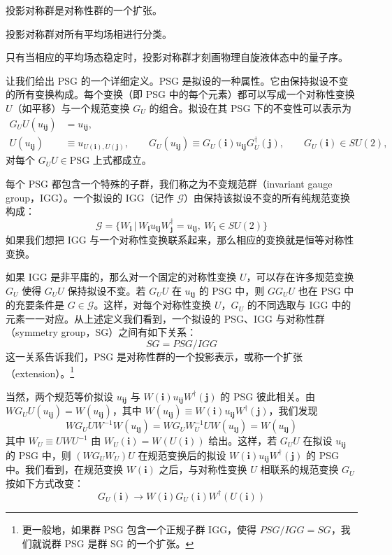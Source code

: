\begin{keypoints}
\item 投影对称群是对称性群的一个扩张。
\item 投影对称群对所有平均场相进行分类。
\item 只有当相应的平均场态稳定时，投影对称群才刻画物理自旋液体态中的量子序。
\end{keypoints}

让我们给出 PSG 的一个详细定义。PSG 是拟设的一种属性。它由保持拟设不变的所有变换构成。每个变换（即 PSG 中的每个元素）都可以写成一个对称性变换 $U$（如平移）与一个规范变换 $G_U$ 的组合。拟设在其 PSG 下的不变性可以表示为
\begin{align*}
G_U U(u_{\pmb{i}\pmb{j}}) &= u_{\pmb{i}\pmb{j}},\tag{9.4.1}\\
U(u_{\pmb{i}\pmb{j}}) &\equiv u_{U(\pmb{i}),U(\pmb{j})},\qquad G_U(u_{\pmb{i}\pmb{j}})\equiv G_U(\pmb{i})u_{\pmb{i}\pmb{j}}G_U^{\dagger}(\pmb{j}),\qquad G_U(\pmb{i})\in SU(2),
\end{align*}
对每个 $G_UU\in\text{PSG}$ 上式都成立。

每个 PSG 都包含一个特殊的子群，我们称之为不变规范群（invariant gauge group，IGG）。一个拟设的 IGG（记作 $\mathcal{G}$）由保持该拟设不变的所有纯规范变换构成：
\begin{equation*}
\mathcal{G}=\{W_{\pmb{i}}\,|\,W_{\pmb{i}}u_{\pmb{i}\pmb{j}}W_{\pmb{j}}^{\dagger}=u_{\pmb{i}\pmb{j}},\ W_{\pmb{i}}\in SU(2)\}
\tag{9.4.2}
\end{equation*}
如果我们想把 IGG 与一个对称性变换联系起来，那么相应的变换就是恒等对称性变换。

如果 IGG 是非平庸的，那么对一个固定的对称性变换 $U$，可以存在许多规范变换 $G_U$ 使得 $G_UU$ 保持拟设不变。若 $G_UU$ 在 $u_{\pmb{i}\pmb{j}}$ 的 PSG 中，则 $GG_UU$ 也在 PSG 中的充要条件是 $G\in\mathcal{G}$。这样，对每个对称性变换 $U$，$G_U$ 的不同选取与 IGG 中的元素一一对应。从上述定义我们看到，一个拟设的 PSG、IGG 与对称性群（symmetry group，SG）之间有如下关系：
\begin{equation*}
SG=PSG/IGG
\end{equation*}
这一关系告诉我们，PSG 是对称性群的一个投影表示，或称一个扩张（extension）。\footnote{更一般地，如果群 PSG 包含一个正规子群 IGG，使得 $PSG/IGG=SG$，我们就说群 PSG 是群 SG 的一个扩张。}

当然，两个规范等价拟设 $u_{\pmb{i}\pmb{j}}$ 与 $W(\pmb{i})u_{\pmb{i}\pmb{j}}W^{\dagger}(\pmb{j})$ 的 PSG 彼此相关。由 $WG_UU(u_{\pmb{i}\pmb{j}})=W(u_{\pmb{i}\pmb{j}})$，其中 $W(u_{\pmb{i}\pmb{j}})\equiv W(\pmb{i})u_{\pmb{i}\pmb{j}}W^{\dagger}(\pmb{j})$，我们发现
\begin{equation*}
WG_UUW^{-1}W(u_{\pmb{i}\pmb{j}})=WG_UW_U^{-1}UW(u_{\pmb{i}\pmb{j}})=W(u_{\pmb{i}\pmb{j}})
\end{equation*}
其中 $W_U\equiv UWU^{-1}$ 由 $W_U(\pmb{i})=W(U(\pmb{i}))$ 给出。这样，若 $G_UU$ 在拟设 $u_{\pmb{i}\pmb{j}}$ 的 PSG 中，则 $(WG_UW_U)U$ 在规范变换后的拟设 $W(\pmb{i})u_{\pmb{i}\pmb{j}}W^{\dagger}(\pmb{j})$ 的 PSG 中。我们看到，在规范变换 $W(\pmb{i})$ 之后，与对称性变换 $U$ 相联系的规范变换 $G_U$ 按如下方式改变：
\begin{equation*}
G_U(\pmb{i})\to W(\pmb{i})G_U(\pmb{i})W^{\dagger}(U(\pmb{i}))
\tag{9.4.3}
\end{equation*}

